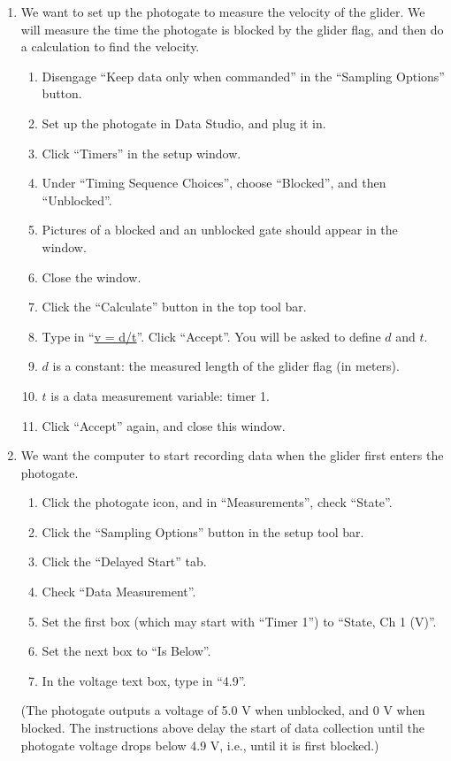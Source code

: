 \begin{enumerate}[label=\arabic*.]
\item We want to set up the photogate to measure the velocity of the glider.  We will measure the time the photogate is blocked by the glider flag, and then do a calculation to find the velocity.
\begin{enumerate}[label=\alph*.]
\item Disengage ``Keep data only when commanded'' in the ``Sampling Options'' button.
\item Set up the photogate in Data Studio, and plug it in.
\item Click ``Timers'' in the setup window.
\item Under ``Timing Sequence Choices'', choose ``Blocked'', and then ``Unblocked''.
\item Pictures of a blocked and an unblocked gate should appear in the window.
\item Close the window.
\item Click the ``Calculate'' button in the top tool bar.
\item Type in ``\url{v = d/t}''.  Click ``Accept''.  You will be asked to define \(d\) and \(t\).
\squishlist
  \item \(d\) is a constant: the measured length of the glider flag (in meters).
  \item \(t\) is a data measurement variable: timer 1.
\squishend

\item Click ``Accept'' again, and close this window.
\end{enumerate}

\item We want the computer to start recording data when the glider first enters the photogate.
\begin{enumerate}[label=\alph*.]
\item Click the photogate icon, and in ``Measurements'', check ``State''.
\item Click the ``Sampling Options'' button in the setup tool bar.
\item Click the ``Delayed Start'' tab.
\item Check ``Data Measurement''.
\item Set the first box (which may start with ``Timer 1'') to ``State, Ch 1 (V)''.
\item Set the next box to ``Is Below''.
\item In the voltage text box, type in ``4.9''.
\end{enumerate}
(The photogate outputs a voltage of 5.0 V when unblocked, and 0 V when blocked.  The instructions above delay the start of data collection until the photogate voltage drops below 4.9 V, i.e., until it is first blocked.)


\end{enumerate}
